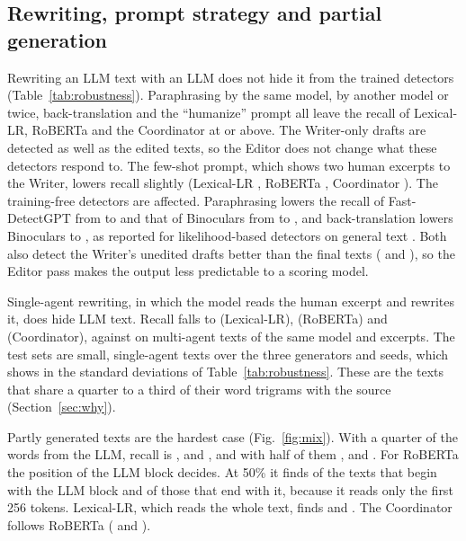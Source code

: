 \documentclass[journal]{IEEEtran}
\begin{document}
\subsection{Rewriting, prompt strategy and partial generation}
Rewriting an LLM text with an LLM does not hide it from the trained detectors (Table~\ref{tab:robustness}).
Paraphrasing by the same model, by another model or twice, back-translation and the ``humanize'' prompt all leave
the recall of Lexical-LR, RoBERTa and the Coordinator at \RecBacktranslateTrans{} or above. The Writer-only drafts
are detected as well as the edited texts, so the Editor does not change what these detectors respond to. The
few-shot prompt, which shows two human excerpts to the Writer, lowers recall slightly (Lexical-LR
\RecPromptFewshotLexlr{}, RoBERTa \RecPromptFewshotTrans{}, Coordinator \RecPromptFewshotCoord{}). The
training-free detectors are affected. Paraphrasing lowers the recall of Fast-DetectGPT from
\RecBaseParaphraseSelfFast{} to \RecParaphraseSelfFast{} and that of Binoculars from \RecBaseParaphraseSelfBino{}
to \RecParaphraseSelfBino{}, and back-translation lowers Binoculars to \RecBacktranslateBino{}, as reported for
likelihood-based detectors on general text \cite{Krishna_2023}. Both also detect the Writer's unedited drafts
better than the final texts (\RecWriterOnlyFast{} and \RecWriterOnlyBino{}), so the Editor pass makes the output
less predictable to a scoring model.

Single-agent rewriting, in which the model reads the human excerpt and rewrites it, does hide LLM text. Recall
falls to \RecSingleLexlr{} (Lexical-LR), \RecSingleTrans{} (RoBERTa) and \RecSingleCoord{} (Coordinator), against
\RecBaseSingleLexlr{} on multi-agent texts of the same model and excerpts. The test sets are small, \NSingleTest{}
single-agent texts over the three generators and seeds, which shows in the standard deviations of
Table~\ref{tab:robustness}. These are the texts that share a quarter to a third of their word trigrams with the
source (Section~\ref{sec:why}).

Partly generated texts are the hardest case (Fig.~\ref{fig:mix}). With a quarter of the words from the LLM, recall
is \RecMixTwoFiveLexlr{}, \RecMixTwoFiveTrans{} and \RecMixTwoFiveCoord{}, and with half of them
\RecMixFiveZeroLexlr{}, \RecMixFiveZeroTrans{} and \RecMixFiveZeroCoord{}. For RoBERTa the position of the LLM
block decides. At 50\% it finds \PosMixFiveZeroFirstTrans{} of the texts that begin with the LLM block and
\PosMixFiveZeroLastTrans{} of those that end with it, because it reads only the first 256 tokens. Lexical-LR, which
reads the whole text, finds \PosMixFiveZeroFirstLexlr{} and \PosMixFiveZeroLastLexlr{}. The Coordinator follows
RoBERTa (\PosMixFiveZeroFirstCoord{} and \PosMixFiveZeroLastCoord{}).
\end{document}

